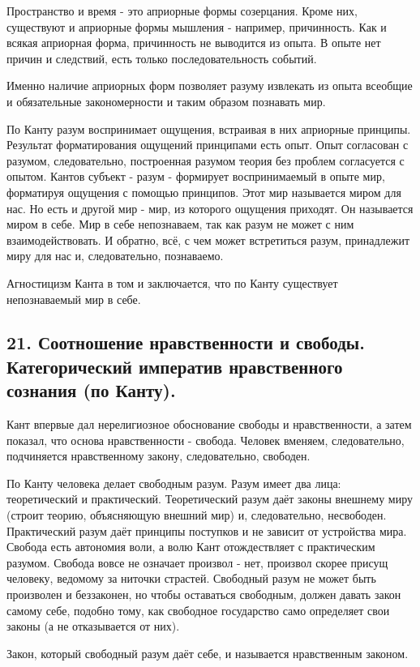 \documentclass[a4paper, 12pt]{article}
\begin{document}
Пространство и время - это априорные формы созерцания.
Кроме них, существуют и априорные формы мышления - например, причинность.
Как и всякая априорная форма, причинность не выводится из опыта.
В опыте нет причин и следствий, есть только последовательность событий.

Именно наличие априорных форм позволяет разуму извлекать из опыта всеобщие и обязательные закономерности и таким образом познавать мир.

По Канту разум воспринимает ощущения, встраивая в них априорные принципы.
Результат форматирования ощущений принципами есть опыт.
Опыт согласован с разумом, следовательно, построенная разумом теория без проблем согласуется с опытом.
Кантов субъект - разум - формирует воспринимаемый в опыте мир, форматируя ощущения с помощью принципов.
Этот мир называется миром для нас.
Но есть и другой мир - мир, из которого ощущения приходят.
Он называется миром в себе.
Мир в себе непознаваем, так как разум не может с ним взаимодействовать.
И обратно, всё, с чем может встретиться разум, принадлежит миру для нас и, следовательно, познаваемо.

Агностицизм Канта в том и заключается, что по Канту существует непознаваемый мир в себе.


\subsection*{\textbf{21. Соотношение нравственности и свободы. Категорический императив нравственного сознания (по Канту).}}

Кант впервые дал нерелигиозное обоснование свободы и нравственности, а затем показал, что основа нравственности - свобода.
Человек вменяем, следовательно, подчиняется нравственному закону, следовательно, свободен.

По Канту человека делает свободным разум.
Разум имеет два лица: теоретический и практический.
Теоретический разум даёт законы внешнему миру (строит теорию, объясняющую внешний мир) и, следовательно, несвободен.
Практический разум даёт принципы поступков и не зависит от устройства мира.
Свобода есть автономия воли, а волю Кант отождествляет с практическим разумом.
Свобода вовсе не означает произвол - нет, произвол скорее присущ человеку, ведомому за ниточки страстей.
Свободный разум не может быть произволен и беззаконен, но чтобы оставаться свободным, должен давать закон самому себе, подобно тому, как свободное государство само определяет свои законы (а не отказывается от них).

Закон, который свободный разум даёт себе, и называется нравственным законом.
\end{document}
